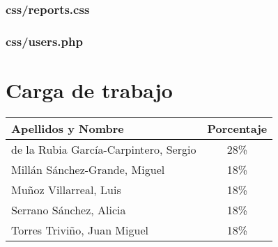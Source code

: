 \documentclass[11pt,a4paper,spanish,twoside]{book}
\begin{document}
\subsection{css/reports.css}
%

\subsection{css/users.php}
%

\appendix
\chapter{Carga de trabajo}
\begin{center}
  \begin{tabular}{p{10cm}|c}
    \textbf{Apellidos y Nombre} & \textbf{Porcentaje} \\ \hline \hline
    de la Rubia García-Carpintero, Sergio & 28\% \\
    Millán Sánchez-Grande, Miguel         & 18\% \\ 
    Muñoz Villarreal, Luis                & 18\% \\ 
    Serrano Sánchez, Alicia               & 18\% \\ 
    Torres Triviño, Juan Miguel           & 18\% \\
  \end{tabular}
\end{center}

 

\end{document}
